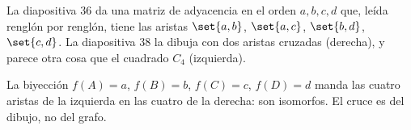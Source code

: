 \documentclass[11pt,letterpaper]{article}
\begin{document}
\begin{ejemplo}
  La diapositiva 36 da una matriz de adyacencia en el orden
  $a, b, c, d$ que, leída renglón por renglón, tiene las aristas
  $\set{a,b}$, $\set{a,c}$, $\set{b,d}$, $\set{c,d}$. La diapositiva
  38 la dibuja con dos aristas cruzadas (derecha), y parece otra cosa
  que el cuadrado $C_4$ (izquierda).
  \begin{center}
  \end{center}
  La biyección $f(A) = a$, $f(B) = b$, $f(C) = c$, $f(D) = d$ manda
  las cuatro aristas de la izquierda en las cuatro de la derecha: son
  isomorfos. El cruce es del dibujo, no del grafo.
\end{ejemplo}
\end{document}
